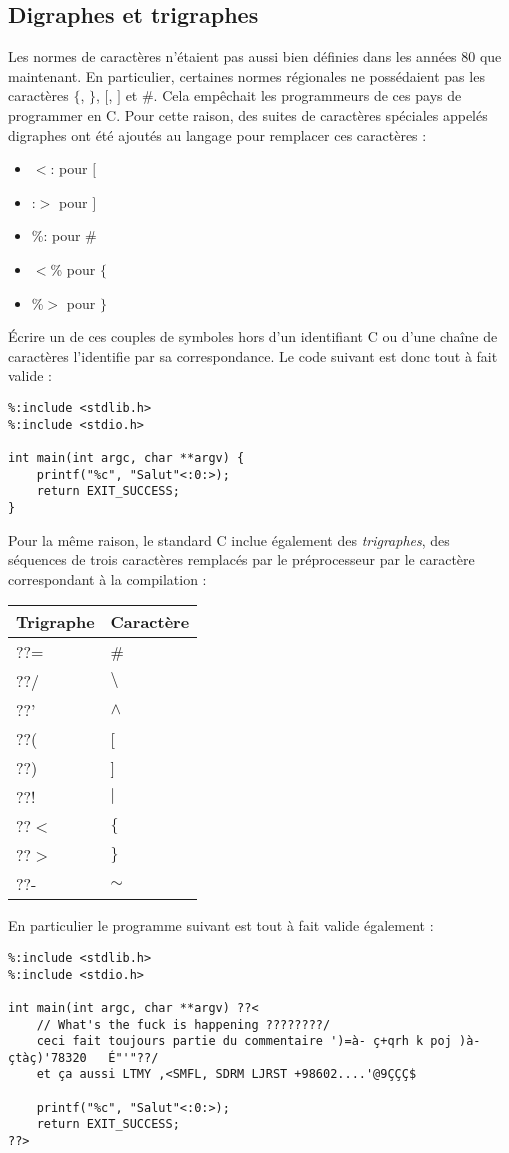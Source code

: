 \documentclass[../../../main.tex]{subfiles}
\begin{document}
\subsection{Digraphes et trigraphes}
Les normes de caractères n'étaient pas aussi bien définies dans les années 80 que maintenant. En particulier, certaines normes régionales ne possédaient pas les caractères $\{$, $\}$, $[$, $]$ et \#. Cela empêchait les programmeurs de ces pays de programmer en C. Pour cette raison, des suites de caractères spéciales appelés digraphes ont été ajoutés au langage pour remplacer ces caractères :
\begin{itemize}
	\item $<$: pour $[$
	\item :$>$ pour $]$
	\item \%: pour \#
	\item $<$\% pour $\{$
	\item \%$>$ pour $\}$
\end{itemize}
Écrire un de ces couples de symboles hors d'un identifiant C ou d'une chaîne de caractères l'identifie par sa correspondance. Le code suivant est donc tout à fait valide :
\begin{verbatim}
%:include <stdlib.h>
%:include <stdio.h>

int main(int argc, char **argv) {
	printf("%c", "Salut"<:0:>);
	return EXIT_SUCCESS;
}
\end{verbatim}
Pour la même raison, le standard C inclue également des \textit{trigraphes}, des séquences de trois caractères remplacés par le préprocesseur par le caractère correspondant à la compilation :
\begin{center}
\begin{tabular}{l|l}
Trigraphe & Caractère \\
\hline
	??= & \# \\
	??/ & $\setminus$ \\
	??' & $\wedge$ \\
	??( & [ \\
	??) & ] \\
	??! & $|$ \\
	??$<$ & $\{$ \\
	??$>$ & $\}$ \\
	??- & $\sim$ \\
\end{tabular}
\end{center}
En particulier le programme suivant est tout à fait valide également :
\begin{verbatim}
%:include <stdlib.h>
%:include <stdio.h>

int main(int argc, char **argv) ??<
	// What's the fuck is happening ????????/
	ceci fait toujours partie du commentaire ')=à- ç+qrh k poj )à-çtàç)'78320	É"'"??/
	et ça aussi LTMY ,<SMFL, SDRM LJRST +98602....'@9ÇÇÇ$

	printf("%c", "Salut"<:0:>);
	return EXIT_SUCCESS;
??>
\end{verbatim}
\end{document}
